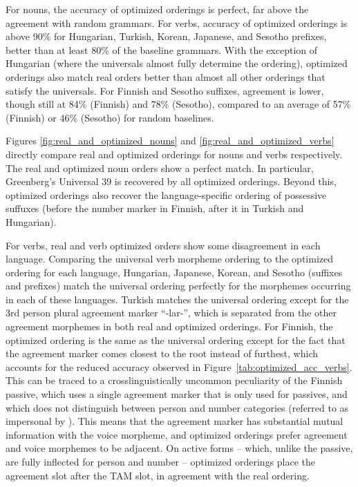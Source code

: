 \documentclass[11pt,letterpaper]{article}
\newcommand{\citet}{\Textcite}
\begin{document}
For nouns, the accuracy of optimized orderings is perfect, far above the agreement with random grammars.
For verbs, accuracy of optimized orderings is above 90\% for Hungarian, Turkish, Korean, Japanese, and Sesotho prefixes, better than at least 80\% of the baseline grammars. 
With the exception of Hungarian (where the universals almost fully determine the ordering), optimized orderings also match real orders better than almost all other orderings that satisfy the universals.
For Finnish and Sesotho suffixes, agreement is lower, though still at 84\% (Finnish) and 78\% (Sesotho), compared to an average of 57\% (Finnish) or 46\% (Sesotho) for random baselines.

Figures \ref{fig:real_and_optimized_nouns} and \ref{fig:real_and_optimized_verbs} directly compare real and optimized orderings for nouns and verbs respectively.
The real and optimized noun orders show a perfect match.
In particular, Greenberg's Universal 39 is recovered by all optimized orderings.
Beyond this, optimized orderings also recover the language-specific ordering of possessive suffuxes (before the number marker in Finnish, after it in Turkish and Hungarian).

For verbs, real and verb optimized orders show some disagreement in each language.
Comparing the universal verb morpheme ordering to the optimized ordering for each language, Hungarian, Japanese, Korean, and Sesotho (suffixes and prefixes) match the universal ordering perfectly for the morphemes occurring in each of these languages. 
Turkish matches the universal ordering except for the 3rd person plural agreement marker ``-lar-'', which is separated from the other agreement morphemes in both real and optimized orderings.
For Finnish, the optimized ordering is the same as the universal ordering except for the fact that the agreement marker comes closest to the root instead of furthest, which accounts for the reduced accuracy observed in Figure~\ref{tab:optimized_acc_verbs}.
This can be traced to a crosslinguistically uncommon peculiarity of the Finnish passive, which uses a single agreement marker that is only used for passives, and which does not distinguish between person and number categories (referred to as impersonal by \citet[Section 69]{karlsson1999finnish}).
This means that the agreement marker has substantial mutual information with the voice morpheme, and optimized orderings prefer agreement and voice morphemes to be adjacent.
On active forms -- which, unlike the passive, are fully inflected for person and number -- optimized orderings place the agreement slot after the TAM slot, in agreement with the real ordering.
\end{document}
